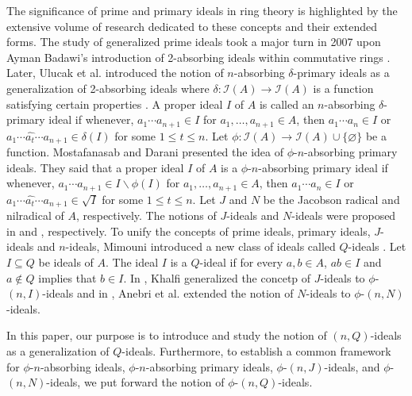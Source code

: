 \documentclass[preprint,review,10pt]{amsart}
\theoremstyle{definition}
\theoremstyle{remark}
\numberwithin{equation}{section}
\begin{document}
The significance of prime and primary ideals in ring theory is highlighted by the extensive volume of research dedicated to these concepts and their extended forms. The study of generalized prime ideals took a major turn in 2007 upon Ayman Badawi's introduction of 2-absorbing ideals within commutative rings \cite{Badawi}. Later, Ulucak et al. introduced the notion of $n$-absorbing $\delta$-primary ideals as a generalization of 2-absorbing ideals where $\delta: \mathcal{I}(A) \to \mathcal{I}(A)$   is a function satisfying certain properties \cite{Ulucak}. A proper ideal $I$ of $A$ is called an $n$-absorbing $\delta$-primary ideal if whenever, $a_1 \cdots a_{n+1} \in I$ for $a_1, \ldots, a_{n+1} \in A$, then $a_1 \cdots a_n \in I$ or $a_1 \cdots \widehat{a_t} \cdots  a_{n+1} \in \delta(I)$ for some $1 \leq t \leq n$. Let $\phi: \mathcal{I}(A) \to  \mathcal{I}(A) \cup \{\varnothing\}$ be a function. Mostafanasab and Darani presented the idea of $\phi$-$n$-absorbing primary ideals. They said that a proper ideal $I$ of $A$ is   a $\phi$-$n$-absorbing  primary ideal if whenever, $a_1 \cdots a_{n+1} \in I \backslash \phi(I)$ for $a_1, \ldots, a_{n+1} \in A$, then $a_1 \cdots a_n \in I$ or $a_1 \cdots \widehat{a_t} \cdots  a_{n+1} \in \sqrt{I}$ for some $1 \leq t \leq n$. Let $J$ and $N$ be the Jacobson radical and nilradical of $A$, respectively. The notions  of $J$-ideals  and $N$-ideals  were proposed in \cite{Khashan2} and \cite{Tekir}, respectively. To unify the concepts  of prime ideals, primary ideals, $J$-ideals and $n$-ideals, 
Mimouni introduced a new class of ideals called $Q$-ideals  \cite{Mimouni}. Let $I \subseteq Q$ be ideals of $A$. The ideal $I$ is a $Q$-ideal if for every $a,b \in A$, $ab \in I$ and $a \notin Q$ implies that $b \in I$. In \cite{Khalfi}, Khalfi generalized the concetp of $J$-ideals to $\phi$-$(n,I)$-ideals  and in \cite{Anebri},  Anebri et al. extended the notion of $N$-ideals to $\phi$-$(n,N)$-ideals. 


 In this paper, our purpose is to introduce and study the notion of $(n,Q)$-ideals as a generalization of $Q$-ideals.  Furthermore, to establish a common framework for $\phi$-$n$-absorbing  ideals, $\phi$-$n$-absorbing primary ideals,  $\phi$-$(n,J)$-ideals, and $\phi$-$(n,N)$-ideals, we put forward the notion of $\phi$-$(n,Q)$-ideals.


 
\end{document}
